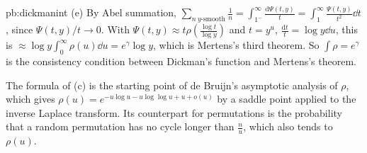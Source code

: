 \begin{solution}{pb:dickmanint}
(e) By Abel summation, $\sum_{n\ y\text{-smooth}}\frac1n=\int_{1^-}^\infty\frac{\mathrm d\Psi(t,y)}t=\int_1^\infty\frac{\Psi(t,y)}{t^2}\dd t$, since $\Psi(t,y)/t\to0$. With $\Psi(t,y)\approx t\rho(\frac{\log t}{\log y})$ and
$t=y^u$, $\frac{\mathrm dt}t=\log y\dd u$, this is $\approx\log y\int_0^\infty\rho(u)\dd u=e^\gamma\log y$, which is Mertens's third theorem. So $\int\rho=e^\gamma$ is the
consistency condition between Dickman's function and Mertens's theorem.

\leads The formula of (c) is the starting point of de Bruijn's asymptotic analysis of $\rho$, which gives $\rho(u)=e^{-u\log u-u\log\log u+u+o(u)}$ by a saddle point applied to the inverse Laplace
transform. Its counterpart for permutations is the probability that a random permutation has no cycle longer than $\frac nu$, which also tends to $\rho(u)$.
\end{solution}

